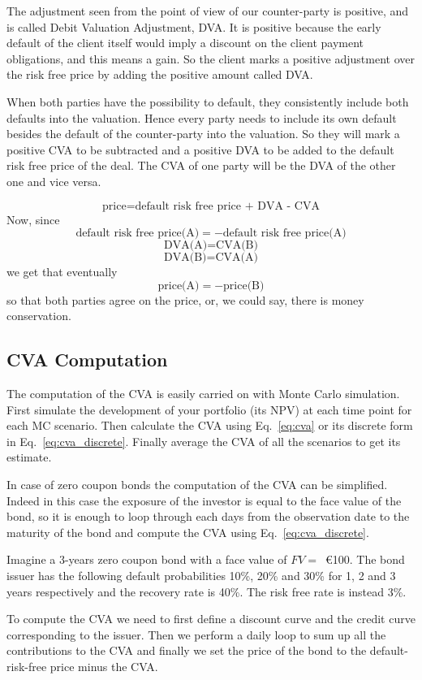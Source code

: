The adjustment seen from the point of view of our counter-party is positive, and is called Debit Valuation Adjustment, DVA. It is positive because the early default of the client itself would imply a discount on the client payment obligations, and this means a gain. So the client marks a positive adjustment over the risk free price by adding the positive amount called DVA. 

When both parties have the possibility to default, they
consistently include both defaults into the valuation. Hence
every party needs to include its own default besides the default of the
counter-party into the valuation. So they will mark a positive
CVA to be subtracted and a positive DVA to be added to the default
risk free price of the deal. The CVA of one party will be the DVA of
the other one and vice versa.

\[
\textrm{price}=\textrm{default risk free price + DVA - CVA}
\]
Now, since
\[
\textrm{default risk free price(A)} = - \textrm{default risk free price(A)}
\]
\[
\textrm{DVA(A)} = \textrm{CVA(B)}
\]
\[
\textrm{DVA(B)} = \textrm{CVA(A)}
\]
we get that eventually
\[
\textrm{price(A)} = -\textrm{price(B)}
\]
so that both parties agree on the price, or, we could say, there is money
conservation.

\subsection{CVA Computation}

The computation of the CVA is easily carried on with Monte Carlo simulation.
First simulate the development of your portfolio (its NPV) at each time point for each MC scenario. 
Then calculate the CVA using Eq.~\ref{eq:cva} or its discrete form in Eq.~\ref{eq:cva_discrete}.
Finally average the CVA of all the scenarios to get its estimate.

In case of zero coupon bonds the computation of the CVA can be simplified. Indeed in this case the exposure of the investor is equal to the face value of the bond, so it is enough to loop through each days from the observation date to the maturity of the bond and compute the CVA using Eq.~\ref{eq:cva_discrete}.

Imagine a 3-years zero coupon bond with a face value of $FV=$~\euro{100}. 
The bond issuer has the following default probabilities 10\%, 20\% and 30\% for 1, 2 and 3 years respectively and the recovery rate is 40\%. The risk free rate is instead 3\%. 

To compute the CVA we need to first define a discount curve and the credit curve corresponding to the issuer. Then we perform a daily loop to sum up all the contributions to the CVA and finally we set the price of the bond to the default-risk-free price minus the CVA.


